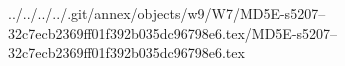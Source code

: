 ../../../../.git/annex/objects/w9/W7/MD5E-s5207--32c7ecb2369ff01f392b035dc96798e6.tex/MD5E-s5207--32c7ecb2369ff01f392b035dc96798e6.tex